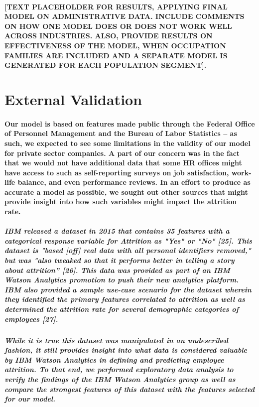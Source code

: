 \documentclass{article}
\begin{document}
\paragraph{[TEXT PLACEHOLDER FOR RESULTS, APPLYING FINAL MODEL ON ADMINISTRATIVE DATA. INCLUDE COMMENTS ON HOW ONE MODEL DOES OR DOES NOT WORK WELL ACROSS INDUSTRIES. ALSO, PROVIDE RESULTS ON EFFECTIVENESS OF THE MODEL, WHEN OCCUPATION FAMILIES ARE INCLUDED AND A SEPARATE MODEL IS GENERATED FOR EACH POPULATION SEGMENT].}

\section{External Validation}

\paragraph{Our model is based on features made public through the Federal Office of Personnel Management and the Bureau of Labor Statistics – as such, we expected to see some limitations in the validity of our model for private sector companies. A part of our concern was in the fact that we would not have additional data that some HR offices might have access to such as self-reporting surveys on job satisfaction, work-life balance, and even performance reviews. In an effort to produce as accurate a model as possible, we sought out other sources that might provide insight into how such variables might impact the attrition rate.}

\subparagraph{IBM released a dataset in 2015 that contains 35 features with a categorical response variable for Attrition as "Yes" or "No" [25]. This dataset is "based [off] real data with all personal identifiers removed," but was "also tweaked so that it performs better in telling a story about attrition” [26]. This data was provided as part of an IBM Watson Analytics promotion to push their new analytics platform. IBM also provided a sample use-case scenario for the dataset wherein they identified the primary features correlated to attrition as well as determined the attrition rate for several demographic categories of employees [27].}

\subparagraph{While it is true this dataset was manipulated in an undescribed fashion, it still provides insight into what data is considered valuable by IBM Watson Analytics in defining and predicting employee attrition. To that end, we performed exploratory data analysis to verify the findings of the IBM Watson Analytics group as well as compare the strongest features of this dataset with the features selected for our model.}
\end{document}
